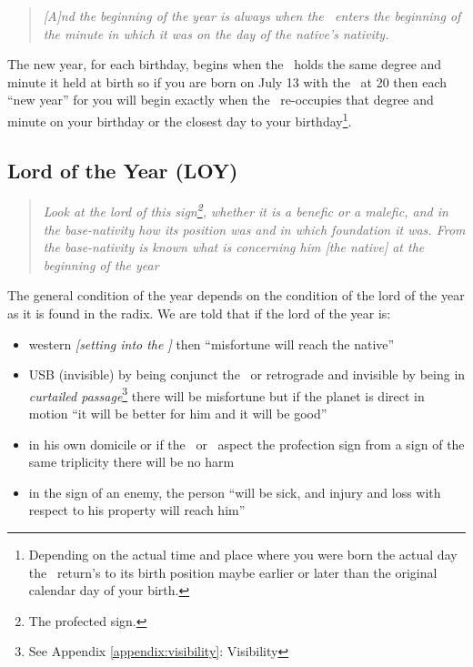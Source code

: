 \begin{quote}
\textsl{[A]nd the beginning of the year is always when the \Sun\, enters the beginning of the minute in which it was on the day of the native's nativity.}
\end{quote}

The new year, for each birthday, begins when the \Sun\, holds the same degree and minute it held at birth so if you are born on July 13 with the \Sun\, at 20 then each ``new year'' for you will begin exactly when the \Sun\, re-occupies that degree and minute on your birthday or the closest day to your birthday\footnote{Depending on the actual time and place where you were born the actual day the \Sun\, return's to its birth position maybe earlier or later than the original calendar day of your birth.}.

\subsection{Lord of the Year (LOY)}
\begin{quote}
\textsl{Look at the lord of this sign\footnote{The profected sign.}, whether it is a benefic or a malefic, and in the base-nativity how its position was and in which foundation it was. From the base-nativity is known what is concerning him [the native] at the beginning of the year}
\end{quote}

The general condition of the year depends on the condition of the lord of the year as it is found in the radix. We are told that if the lord of the year is:
\begin{itemize}[topsep=0em,itemsep=0em]
\item {}western \textsl{[setting into the \Sun]} then ``misfortune will reach the native''

\item {}USB (invisible) by being conjunct the \Sun\, or retrograde and invisible by being in \textsl{curtailed passage}\footnote{See Appendix \ref{appendix:visibility}{: Visibility}} there will be misfortune but if the planet is direct in motion ``it will be better for him and it will be good''

\item {}in his own domicile or if the \Sun\, or \Moon\, aspect the profection sign from a sign of the same triplicity there will be no harm

\item {}in the sign of an enemy, the person ``will be sick, and injury and loss with respect to his property will reach him''
\end{itemize}

